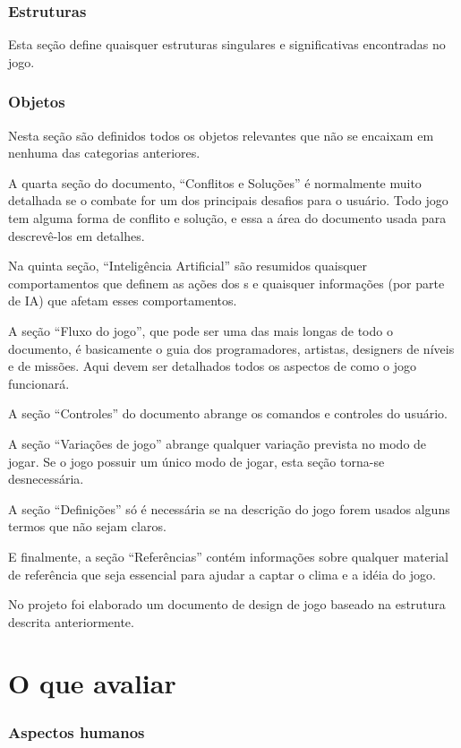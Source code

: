 \subsubsection{Estruturas}
Esta seção define quaisquer estruturas singulares e significativas encontradas no jogo.
\subsubsection{Objetos}
Nesta seção são definidos todos os objetos relevantes que não se encaixam em nenhuma das categorias anteriores.


A quarta seção do documento, ``Conflitos e Soluções'' é normalmente muito detalhada se o combate for um dos principais desafios para o usuário. Todo jogo tem alguma forma de conflito e solução, e essa a área do documento usada para descrevê-los em detalhes.


Na quinta seção, ``Inteligência Artificial'' são resumidos quaisquer comportamentos que definem as ações dos \npc{}s e quaisquer informações (por parte de IA) que afetam esses comportamentos.


A seção ``Fluxo do jogo'', que pode ser uma das mais longas de todo o documento, é basicamente o guia dos programadores, artistas, designers de níveis e de missões. Aqui devem ser detalhados todos os aspectos de como o jogo funcionará.


A seção ``Controles'' do documento abrange os comandos e controles do usuário.

A seção ``Variações de jogo'' abrange qualquer variação prevista no modo de jogar. Se o jogo possuir um único modo de jogar, esta seção torna-se desnecessária.


A seção ``Definições'' só é necessária se na descrição do jogo forem usados alguns termos que não sejam claros.

E finalmente, a seção ``Referências'' contém informações sobre qualquer material de referência que seja essencial para ajudar a captar o clima e a idéia do jogo.


No projeto foi elaborado um documento de design de jogo baseado na estrutura descrita anteriormente.



\section{O que avaliar}

\subsubsection{Aspectos humanos} 

